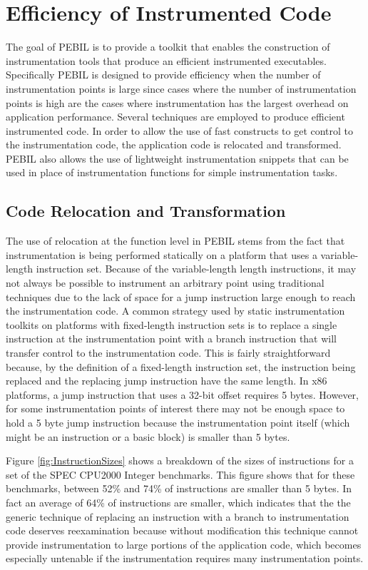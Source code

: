 \section{Efficiency of Instrumented Code}
\label{sec:Efficiency}

The goal of PEBIL is to provide a toolkit that enables the construction of
instrumentation tools that produce an efficient instrumented
executables. Specifically PEBIL is designed to provide efficiency when
the number of instrumentation points is large since cases where the number of
instrumentation points is high are the cases where instrumentation
has the largest overhead on application performance. 
Several techniques are employed to produce efficient instrumented code. In order
to allow the use of fast constructs to get control to the instrumentation code,
the application code is relocated and transformed. PEBIL also allows the use
of lightweight instrumentation snippets that can be used in place of
instrumentation functions for simple instrumentation tasks.

\subsection{Code Relocation and Transformation}
\label{Subsection:Relocation}
The use of relocation at the function level in PEBIL stems from the fact
that instrumentation is being performed statically on a platform that uses a
variable-length instruction set. Because of the variable-length length instructions, it may not always be possible to instrument
an arbitrary point using traditional techniques due to the lack of space for a jump instruction large enough to reach the instrumentation code. 
A common strategy used by static instrumentation toolkits on platforms with fixed-length instruction sets is to
replace a single instruction at the instrumentation point with a
branch instruction that will transfer control to the instrumentation code. This is fairly straightforward because, by the
definition of a fixed-length instruction set, the instruction being replaced and
the replacing jump instruction have the same length. 
In x86 platforms, a jump instruction that uses a 32-bit offset requires 5 bytes. However, for some
instrumentation points of interest there may not be enough space to hold a 5 byte
jump instruction because the instrumentation point itself (which might be an instruction or a
basic block) is smaller than 5 bytes. 

Figure \ref{fig:InstructionSizes} shows a breakdown of the sizes of
instructions for a set of the SPEC CPU2000 Integer benchmarks. This figure shows that for these benchmarks,
between 52\% and 74\% of instructions are smaller than 5 bytes. In fact an average of 64\% of instructions
are smaller, which indicates that the the generic technique of replacing 
an instruction with a branch to instrumentation code deserves reexamination because without modification
this technique cannot provide instrumentation to large portions of the application code, which becomes
especially untenable if the instrumentation requires many instrumentation points.

